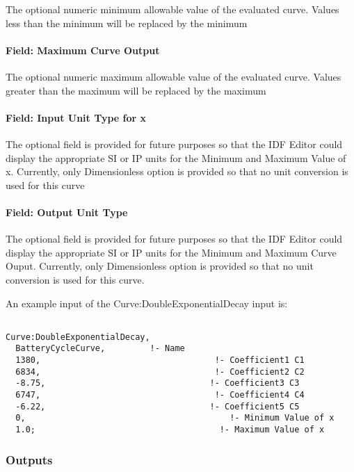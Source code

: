 The optional numeric minimum allowable value of the evaluated curve. Values less than the minimum will be replaced by the minimum

\paragraph{Field: Maximum Curve Output}\label{field-maximum-curve-output-16}

The optional numeric maximum allowable value of the evaluated curve. Values greater than the maximum will be replaced by the maximum

\paragraph{Field: Input Unit Type for x}\label{field-input-unit-type-for-x-17}

The optional field is provided for future purposes so that the IDF Editor could display the appropriate SI or IP units for the Minimum and Maximum Value of x. Currently, only Dimensionless option is provided so that no unit conversion is used for this curve

\paragraph{Field: Output Unit Type}\label{field-output-unit-type-16}

The optional field is provided for future purposes so that the IDF Editor could display the appropriate SI or IP units for the Minimum and Maximum Curve Ouput. Currently, only Dimensionless option is provided so that no unit conversion is used for this curve.

An example input of the Curve:DoubleExponentialDecay input is:

\begin{lstlisting}

Curve:DoubleExponentialDecay,
  BatteryCycleCurve,         !- Name
  1380,                                   !- Coefficient1 C1
  6834,                                   !- Coefficient2 C2
  -8.75,                                 !- Coefficient3 C3
  6747,                                   !- Coefficient4 C4
  -6.22,                                 !- Coefficient5 C5
  0,                                         !- Minimum Value of x
  1.0;                                     !- Maximum Value of x
\end{lstlisting}

\subsubsection{Outputs}\label{outputs-021}

